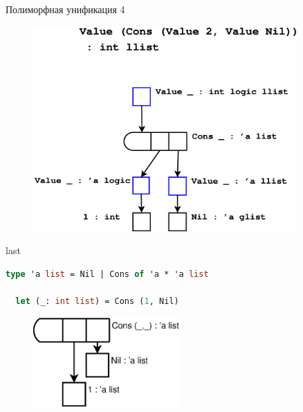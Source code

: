 \documentclass[10pt, mathserif]{beamer}
\theoremstyle{definition}
\begin{document}
\begin{frame}[fragile]{Полиморфная унификация 4}

\begin{figure}
\centering
\includegraphics[width=0.9\textwidth]{img2.eps}
\end{figure}

\end{frame}

%

\begin{frame}[fragile]{last}

  \begin{lstlisting}[language=ml]
  type 'a list = Nil | Cons of 'a * 'a list

  let (_: int list) = Cons (1, Nil)
  \end{lstlisting}

  \begin{figure}
  \centering
  \includegraphics[width=0.5\textwidth]{img1.eps}
  \end{figure}
\end{frame}
\end{document}
